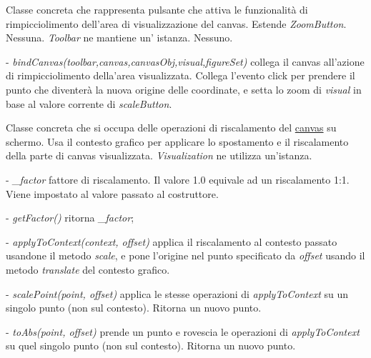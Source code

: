 Classe concreta che rappresenta pulsante che attiva le funzionalit\` a di rimpicciolimento dell'area di visualizzazione del canvas.
Estende \textit{ZoomButton}.
Nessuna.
\textit{Toolbar} ne mantiene un' istanza.
Nessuno.
\begin{elencopuntato}[\subsubsecindent]
\item[-] \textit{bindCanvas(toolbar,canvas,canvasObj,visual,figureSet)} collega il canvas all'azione di rimpicciolimento della'area visualizzata. Collega l'evento click per prendere il punto che diventer\`a la nuova origine delle coordinate, e setta lo zoom di \textit{visual} in base al valore corrente di \textit{scaleButton}.
\end{elencopuntato}

Classe concreta che si occupa delle operazioni di riscalamento del \underline{canvas} su schermo. 
Usa il contesto grafico per applicare lo spostamento e il riscalamento della parte di canvas visualizzata.
\textit{Visualization} ne utilizza un'istanza.
\begin{elencopuntato}[\subsubsecindent]
\item[-] \textit{{\_}factor} fattore di riscalamento. Il valore 1.0 equivale ad un riscalamento 1:1. Viene impostato al valore passato al costruttore.
\end{elencopuntato}
\begin{elencopuntato}[\subsubsecindent]
\item[-] \textit{getFactor()} ritorna \textit{{\_}factor};
\item[-] \textit{applyToContext(context, offset)} applica il riscalamento al contesto passato usandone il metodo \textit{scale}, e pone l'origine nel punto specificato da \textit{offset} usando il metodo \textit{translate} del contesto grafico.
\item[-] \textit{scalePoint(point, offset)} applica le stesse operazioni di \textit{applyToContext} su un singolo punto (non sul contesto). Ritorna un nuovo punto.
\item[-] \textit{toAbs(point, offset)} prende un punto e rovescia le operazioni di \textit{applyToContext} su quel singolo punto (non sul contesto). Ritorna un nuovo punto.
\end{elencopuntato}

